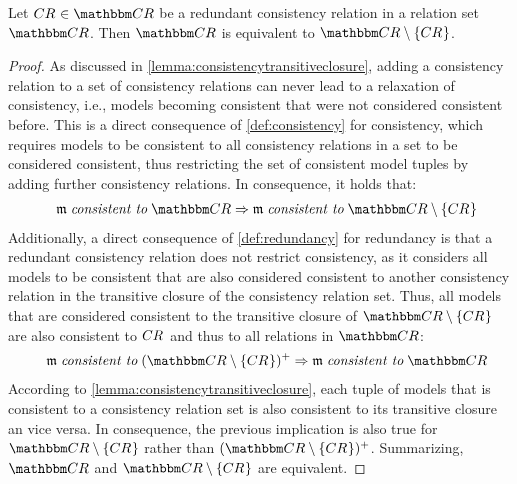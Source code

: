 
\begin{lemma} \label{lemma:redundancyimpliesequivalence}
    Let $\consistencyrelation{CR}{} \in \consistencyrelationset{CR}$ be a redundant consistency relation in a relation set $\consistencyrelationset{CR}$.
    Then $\consistencyrelationset{CR}$ is equivalent to $\consistencyrelationset{CR} \setminus \setted{\consistencyrelation{CR}{}}$.
\end{lemma}

\begin{proof}
    As discussed in \autoref{lemma:consistencytransitiveclosure}, adding a consistency relation to a set of consistency relations can never lead to a relaxation of consistency, i.e., models becoming consistent that were not considered consistent before. This is a direct consequence of \autoref{def:consistency} for consistency, which requires models to be consistent to all consistency relations in a set to be considered consistent, thus restricting the set of consistent model tuples by adding further consistency relations.
    In consequence, it holds that:
    \begin{align*}
        \formulaskip
        \modeltuple{m} \consistenttomath \consistencyrelationset{CR} \Rightarrow 
        \modeltuple{m} \consistenttomath \consistencyrelationset{CR} \setminus \setted{\consistencyrelation{CR}{}}
    \end{align*}
    Additionally, a direct consequence of \autoref{def:redundancy} for redundancy is that a redundant consistency relation does not restrict consistency, as it considers all models to be consistent that are also considered consistent to another consistency relation in the transitive closure of the consistency relation set. Thus, all models that are considered consistent to the transitive closure of $\consistencyrelationset{CR} \setminus \setted{\consistencyrelation{CR}{}}$ are also consistent to $\consistencyrelation{CR}{}$ and thus to all relations in $\consistencyrelationset{CR}$:
    \begin{align*}
        \formulaskip
        \modeltuple{m} \consistenttomath \transitiveclosure{(\consistencyrelationset{CR} \setminus \setted{\consistencyrelation{CR}{}})} \Rightarrow 
        \modeltuple{m} \consistenttomath \consistencyrelationset{CR}
    \end{align*}
    According to \autoref{lemma:consistencytransitiveclosure}, each tuple of models that is consistent to a consistency relation set is also consistent to its transitive closure an vice versa.
    In consequence, the previous implication is also true for $\consistencyrelationset{CR} \setminus \setted{\consistencyrelation{CR}{}}$ rather than $\transitiveclosure{(\consistencyrelationset{CR} \setminus \setted{\consistencyrelation{CR}{}})}$.
    Summarizing, $\consistencyrelationset{CR}$ and $\consistencyrelationset{CR} \setminus \setted{\consistencyrelation{CR}{}}$ are equivalent.
\end{proof}

